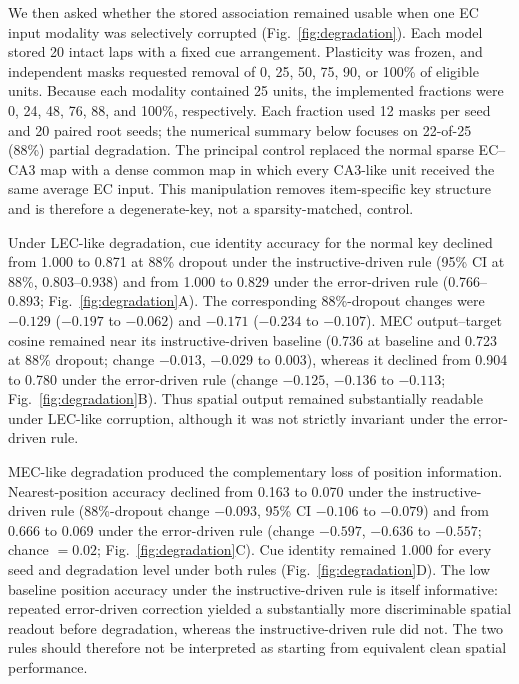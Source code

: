 We then asked whether the stored association remained usable when one EC input
modality was selectively corrupted (Fig.~\ref{fig:degradation}). Each model
stored 20 intact laps with a fixed cue arrangement. Plasticity was frozen, and
independent masks requested removal of 0, 25, 50, 75, 90, or 100\% of eligible
units. Because each modality contained 25 units, the implemented fractions
were 0, 24, 48, 76, 88, and 100\%, respectively. Each fraction used 12 masks
per seed and 20 paired root seeds; the numerical summary below focuses on
22-of-25 (88\%) partial degradation. The principal control
replaced the normal sparse EC--CA3 map with a dense common map in which every
CA3-like unit received the same average EC input. This manipulation removes
item-specific key structure and is therefore a degenerate-key, not a
sparsity-matched, control.

Under LEC-like degradation, cue identity accuracy for the normal key declined
from 1.000 to 0.871 at 88\% dropout under the instructive-driven rule (95\% CI
at 88\%, 0.803--0.938) and from 1.000 to 0.829 under the error-driven
rule (0.766--0.893;
Fig.~\ref{fig:degradation}A). The corresponding 88\%-dropout changes were
$-0.129$ ($-0.197$ to $-0.062$) and $-0.171$ ($-0.234$ to $-0.107$).
MEC output--target cosine remained near its instructive-driven baseline (0.736 at
baseline and 0.723 at 88\% dropout; change $-0.013$, $-0.029$ to
$0.003$), whereas it declined from 0.904 to 0.780 under the error-driven rule
(change $-0.125$,
$-0.136$ to $-0.113$; Fig.~\ref{fig:degradation}B). Thus spatial output
remained substantially readable under LEC-like corruption, although it was not
strictly invariant under the error-driven rule.

MEC-like degradation produced the complementary loss of position information.
Nearest-position accuracy declined from 0.163 to 0.070 under the
instructive-driven rule (88\%-dropout
change $-0.093$, 95\% CI $-0.106$ to $-0.079$) and from 0.666 to 0.069 under
the error-driven rule (change $-0.597$, $-0.636$ to $-0.557$; chance $=0.02$;
Fig.~\ref{fig:degradation}C). Cue identity remained 1.000 for every seed and
degradation level under both rules (Fig.~\ref{fig:degradation}D). The low
baseline position accuracy under the instructive-driven rule is itself
informative: repeated
error-driven correction yielded a substantially more discriminable spatial
readout before degradation, whereas the instructive-driven rule did not. The two rules
should therefore not be interpreted as starting from equivalent clean spatial
performance.

